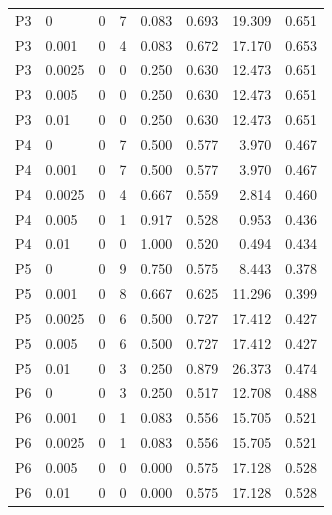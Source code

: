 \begin{longtable}{llrrrrrr}
P3 & 0 & 0 & 7 & 0.083 & 0.693 & 19.309 & 0.651\\

P3 & 0.001 & 0 & 4 & 0.083 & 0.672 & 17.170 & 0.653\\

P3 & 0.0025 & 0 & 0 & 0.250 & 0.630 & 12.473 & 0.651\\

P3 & 0.005 & 0 & 0 & 0.250 & 0.630 & 12.473 & 0.651\\

P3 & 0.01 & 0 & 0 & 0.250 & 0.630 & 12.473 & 0.651\\

P4 & 0 & 0 & 7 & 0.500 & 0.577 & 3.970 & 0.467\\

P4 & 0.001 & 0 & 7 & 0.500 & 0.577 & 3.970 & 0.467\\

P4 & 0.0025 & 0 & 4 & 0.667 & 0.559 & 2.814 & 0.460\\

P4 & 0.005 & 0 & 1 & 0.917 & 0.528 & 0.953 & 0.436\\

P4 & 0.01 & 0 & 0 & 1.000 & 0.520 & 0.494 & 0.434\\

P5 & 0 & 0 & 9 & 0.750 & 0.575 & 8.443 & 0.378\\

P5 & 0.001 & 0 & 8 & 0.667 & 0.625 & 11.296 & 0.399\\

P5 & 0.0025 & 0 & 6 & 0.500 & 0.727 & 17.412 & 0.427\\

P5 & 0.005 & 0 & 6 & 0.500 & 0.727 & 17.412 & 0.427\\

P5 & 0.01 & 0 & 3 & 0.250 & 0.879 & 26.373 & 0.474\\

P6 & 0 & 0 & 3 & 0.250 & 0.517 & 12.708 & 0.488\\

P6 & 0.001 & 0 & 1 & 0.083 & 0.556 & 15.705 & 0.521\\

P6 & 0.0025 & 0 & 1 & 0.083 & 0.556 & 15.705 & 0.521\\

P6 & 0.005 & 0 & 0 & 0.000 & 0.575 & 17.128 & 0.528\\

P6 & 0.01 & 0 & 0 & 0.000 & 0.575 & 17.128 & 0.528\\

\bottomrule\end{longtable}\endgroup

